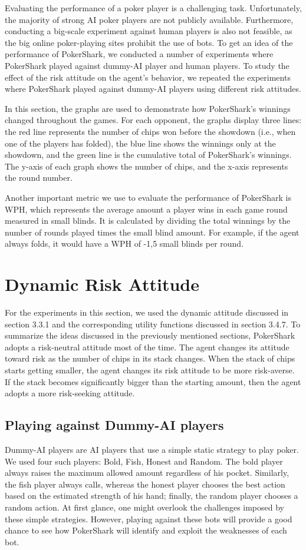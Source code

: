 
Evaluating the performance of a poker player is a challenging task. Unfortunately, the majority of strong AI poker players are not publicly available. Furthermore, conducting a big-scale experiment against human players is also not feasible, as the big online poker-playing sites prohibit the use of bots. To get an idea of the performance of PokerShark, we conducted a number of experiments where PokerShark played against dummy-AI player and human players. To study the effect of the risk attitude on the agent's behavior, we repeated the experiments where PokerShark played against dummy-AI players using different risk attitudes.

In this section, the graphs are used to demonstrate how PokerShark's winnings changed throughout the games. For each opponent, the graphs display three lines: the red line represents the number of chips won before the showdown (i.e., when one of the players has folded), the blue line shows the winnings only at the showdown, and the green line is the cumulative total of PokerShark's winnings. The y-axis of each graph shows the number of chips, and the x-axis represents the round number.

Another important metric we use to evaluate the performance of PokerShark is WPH, which represents the average amount a player wins in each game round measured in small blinds. It is calculated by dividing the total winnings by the number of rounds played times the small blind amount. For example, if the agent always folds, it would have a WPH of -1,5 small blinds per round.

\section{Dynamic Risk Attitude}
For the experiments in this section, we used the dynamic attitude discussed in section 3.3.1 and the corresponding utility functions discussed in section 3.4.7. To summarize the ideas discussed in the previously mentioned sections, PokerShark adopts a risk-neutral attitude most of the time. The agent changes its attitude toward risk as the number of chips in its stack changes. When the stack of chips starts getting smaller, the agent changes its risk attitude to be more risk-averse. If the stack becomes significantly bigger than the starting amount, then the agent adopts a more risk-seeking attitude.

\subsection*{Playing against Dummy-AI players}
Dummy-AI players are AI players that use a simple static strategy to play poker. We used four such players: Bold, Fish, Honest and Random. The bold player always raises the maximum allowed amount regardless of his pocket. Similarly, the fish player always calls, whereas the honest player chooses the best action based on the estimated strength of his hand; finally, the random player chooses a random action.
At first glance, one might overlook the challenges imposed by these simple strategies. However, playing against these bots will provide a good chance to see how PokerShark will identify and exploit the weaknesses of each bot.


